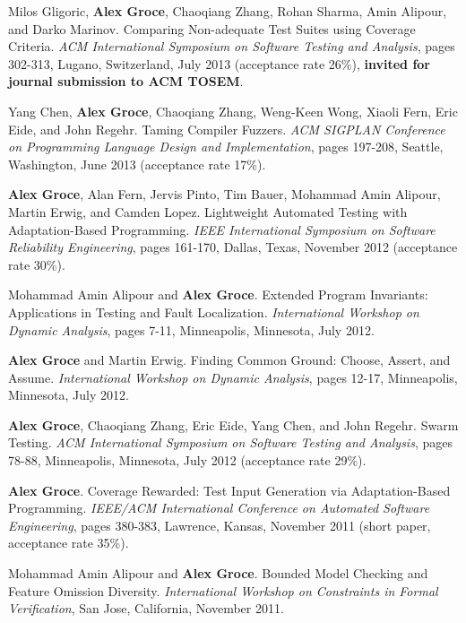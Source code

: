 \documentclass[ComputerScience]{vita}
\begin{document}
\begin{vita}
\begin{Refereed Conference and Workshop Publications}
\item Milos Gligoric, {\bf Alex Groce}, Chaoqiang Zhang, Rohan Sharma, Amin Alipour, and Darko Marinov.
\newblock Comparing Non-adequate Test Suites using Coverage Criteria.
\newblock \emph{ACM International Symposium on Software Testing and Analysis}, pages 302-313, Lugano, Switzerland, July 2013 (acceptance rate 26\%), {\bf invited for journal submission to ACM TOSEM}.

\item Yang Chen, {\bf Alex Groce}, Chaoqiang Zhang, Weng-Keen Wong, Xiaoli Fern, Eric Eide, and John Regehr.
\newblock Taming Compiler Fuzzers.
\newblock \emph{ACM SIGPLAN Conference on Programming Language Design and Implementation}, pages 197-208, Seattle, Washington, June 2013 (acceptance rate 17\%).

\item {\bf Alex Groce}, Alan Fern, Jervis Pinto, Tim Bauer, Mohammad Amin Alipour, Martin Erwig, and Camden Lopez.
\newblock Lightweight Automated Testing with Adaptation-Based Programming.
\newblock \emph{IEEE International Symposium on Software Reliability Engineering}, pages 161-170, Dallas, Texas, November 2012 (acceptance rate 30\%).

\item Mohammad Amin Alipour and {\bf Alex Groce}.
\newblock Extended Program Invariants: Applications in Testing and Fault Localization.
\newblock \emph{International Workshop on Dynamic Analysis}, pages 7-11, Minneapolis, Minnesota, July 2012.

\item {\bf Alex Groce} and Martin Erwig.
\newblock Finding Common Ground: Choose, Assert, and Assume.
\newblock \emph{International Workshop on Dynamic Analysis}, pages 12-17, Minneapolis, Minnesota, July 2012.

\item {\bf Alex Groce}, Chaoqiang Zhang, Eric Eide, Yang Chen, and John Regehr.
\newblock Swarm Testing.
\newblock \emph{ACM International Symposium on Software Testing and Analysis}, pages 78-88, Minneapolis, Minnesota, July 2012 (acceptance rate 29\%).

\item {\bf Alex Groce}.
\newblock Coverage Rewarded: Test Input Generation via Adaptation-Based Programming.
\newblock \emph{IEEE/ACM International Conference on Automated Software Engineering}, pages 380-383, Lawrence, Kansas, November 2011 (short paper, acceptance rate 35\%).

\item
Mohammad Amin Alipour and {\bf Alex Groce}.
\newblock Bounded Model Checking and Feature Omission Diversity.
\newblock \emph{International Workshop on Constraints in Formal Verification}, San Jose, California, November 2011.


\end{Refereed Conference and Workshop Publications}
\end{vita}
\end{document}
